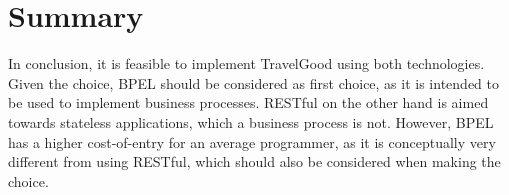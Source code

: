 \section{Summary}
\mrb

\noindent
In conclusion, it is feasible to implement TravelGood using both technologies. Given the choice, BPEL should be considered as first choice, as it is intended to be used to implement business processes. RESTful on the other hand is aimed towards stateless applications, which a business process is not. However, BPEL has a higher cost-of-entry for an average programmer, as it is conceptually very different from using RESTful, which should also be considered when making the choice.


